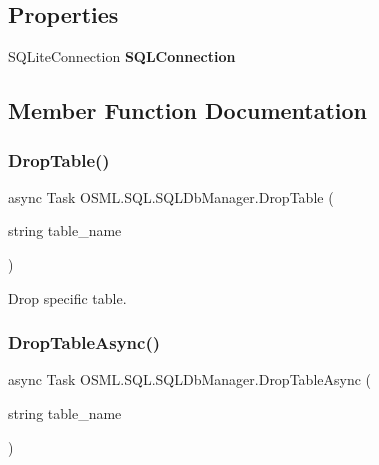 \subsection*{Properties}
\begin{DoxyCompactItemize}
\item 
\mbox{\label{classOSML_1_1SQL_1_1SQLDbManager_a81e6f2c59f2bd3e24de336f2915a8c71}} 
S\+Q\+Lite\+Connection {\bfseries S\+Q\+L\+Connection}
\end{DoxyCompactItemize}


\subsection{Member Function Documentation}
\mbox{\label{classOSML_1_1SQL_1_1SQLDbManager_a5118e36397a914f95ee1cd51675c7d06}} 
\subsubsection{\texorpdfstring{DropTable()}{DropTable()}}
{\footnotesize\ttfamily async Task O\+S\+M\+L.\+S\+Q\+L.\+S\+Q\+L\+Db\+Manager.\+Drop\+Table (\begin{DoxyParamCaption}\item[{string}]{table\+\_\+name }\end{DoxyParamCaption})\hspace{0.3cm}{\ttfamily [inline]}}



Drop specific table. 

\mbox{\label{classOSML_1_1SQL_1_1SQLDbManager_afaaaf7303202a86ee7730e7b4a108302}} 
\subsubsection{\texorpdfstring{DropTableAsync()}{DropTableAsync()}}
{\footnotesize\ttfamily async Task O\+S\+M\+L.\+S\+Q\+L.\+S\+Q\+L\+Db\+Manager.\+Drop\+Table\+Async (\begin{DoxyParamCaption}\item[{string}]{table\+\_\+name }\end{DoxyParamCaption})\hspace{0.3cm}{\ttfamily [inline]}}



